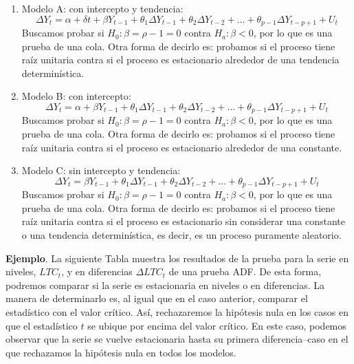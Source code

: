\documentclass[
]{book}
\begin{document}
\begin{enumerate}
\def\labelenumi{\arabic{enumi}.}
\item
  Modelo A: con intercepto y tendencia:
  \begin{equation*}
  \Delta Y_t = \alpha + \delta t + \beta Y_{t-1} + \theta_1 \Delta Y_{t-1} + \theta_2 \Delta Y_{t-2} + \ldots + \theta_{p-1} \Delta Y_{t-p+1} + U_t
    \end{equation*}
  Buscamos probar si \(H_0 : \beta = \rho - 1 = 0\) contra \(H_a : \beta < 0\), por lo que es una prueba de una cola. Otra forma de decirlo es: probamos si el proceso tiene raíz unitaria contra si el proceso es estacionario alrededor de una tendencia determinística.
\item
  Modelo B: con intercepto:
  \begin{equation*}
   \Delta Y_t = \alpha + \beta Y_{t-1} + \theta_1 \Delta Y_{t-1} + \theta_2 \Delta Y_{t-2} + \ldots + \theta_{p-1} \Delta Y_{t-p+1} + U_t
    \end{equation*}
  Buscamos probar si \(H_0 : \beta = \rho - 1 = 0\) contra \(H_a : \beta < 0\), por lo que es una prueba de una cola. Otra forma de decirlo es: probamos si el proceso tiene raíz unitaria contra si el proceso es estacionario alrededor de una constante.
\item
  Modelo C: sin intercepto y tendencia:
  \begin{equation*}
   \Delta Y_t = \beta Y_{t-1} + \theta_1 \Delta Y_{t-1} + \theta_2 \Delta Y_{t-2} + \ldots + \theta_{p-1} \Delta Y_{t-p+1} + U_t
    \end{equation*}
  Buscamos probar si \(H_0 : \beta = \rho - 1 = 0\) contra \(H_a : \beta < 0\), por lo que es una prueba de una cola. Otra forma de decirlo es: probamos si el proceso tiene raíz unitaria contra si el proceso es estacionario sin considerar una constante o una tendencia determinística, es decir, es un proceso puramente aleatorio.
\end{enumerate}

\textbf{Ejemplo}. La siguiente Tabla muestra los resultados de la prueba para la serie en niveles, \(LTC_t\), y en diferencias \(\Delta LTC_t\) de una prueba ADF. De esta forma, podremos comparar si la serie es estacionaria en niveles o en diferencias. La manera de determinarlo es, al igual que en el caso anterior, comparar el estadístico con el valor crítico. Así, rechazaremos la hipótesis nula en los casos en que el estadístico \(t\) se ubique por encima del valor crítico. En este caso, podemos observar que la serie se vuelve estacionaria hasta su primera diferencia--caso en el que rechazamos la hipótesis nula en todos los modelos.
\end{document}
